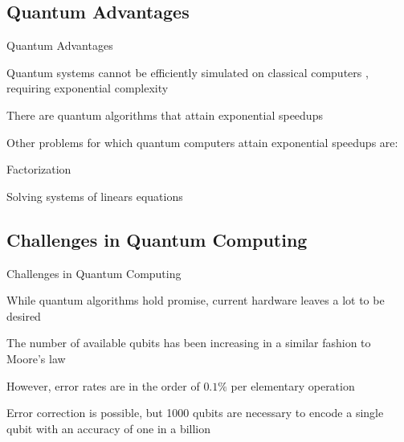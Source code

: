 \documentclass[professionalfonts]{beamer}
\newcommand{\SubItem}[1]{
    {\setlength\itemindent{15pt} \item[*] #1}
}
\begin{document}




\subsection{\textbf{Quantum Advantages}}
\begin{frame}{Quantum Advantages}
	\begin{itemize}
		\item Quantum systems cannot be efficiently simulated on classical computers \citep{feynman}, requiring exponential complexity
		\SubItem{There are quantum algorithms \citep{quantumsimulation} that attain exponential speedups}
		\item Other problems for which quantum computers attain exponential speedups are:
			\SubItem{Factorization \citep{shor}}
			\SubItem{Solving systems of linears equations \citep{harrow}}
	\end{itemize}
\end{frame}



\subsection{\textbf{Challenges in Quantum Computing}}

\begin{frame}{Challenges in Quantum Computing}
	\begin{itemize}
		\item While quantum algorithms hold promise, current hardware leaves a lot to be desired
		\item The number of available qubits has been increasing in a similar fashion to Moore's law \citep{moorequantum}
			\SubItem{However, error rates are in the order of $0.1\%$ per elementary operation \citep{ibmblog}}
			\SubItem{Error correction is possible, but 1000 qubits are necessary to encode a single qubit with an accuracy of one in a billion \citep{moorequantum}}
	\end{itemize}
\end{frame}
\end{document}
